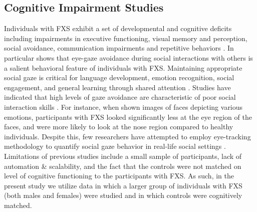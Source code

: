 \documentclass[10pt,twocolumn,letterpaper]{article}
\begin{document}
\subsection{Cognitive Impairment Studies} Individuals with FXS exhibit a set of developmental and cognitive deficits including impairments in executive functioning, visual memory and perception, social avoidance, communication impairments and repetitive behaviors \cite{Hall:2006jd,Pimentel:1999vx,Sullivan:2007gz,Sullivan:2006jc}. In particular \cite{Hall:2012ge} shows that eye-gaze avoidance during social interactions with others is a salient behavioral feature of individuals with FXS. Maintaining appropriate social gaze is critical for language development, emotion recognition, social engagement, and general learning through shared attention \cite{Csibra:2006wf, Morales:2000br,Emery:2000ug}. Studies have indicated that high levels of gaze avoidance are characteristic of poor social interaction skills \cite{DohertySneddon:2013fv,Riby:2012il}. For instance, when shown images of faces depicting various emotions, participants with FXS looked significantly less at the eye region of the faces, and were more likely to look at the nose region compared to healthy individuals. Despite this, few researchers have attempted to employ eye-tracking methodology to quantify social gaze behavior in real-life social settings \cite{Farzin:2009fq, Farzin:2011ip}.   Limitations of previous studies include a small sample of participants, lack of automation \& scalability, and the fact that the controls were not matched on level of cognitive functioning to the participants with FXS. As such, in the present study we utilize data in which a larger group of individuals with FXS (both males and females) were studied and in which controls were cognitively matched.
\vspace{-0.2cm}
\end{document}
